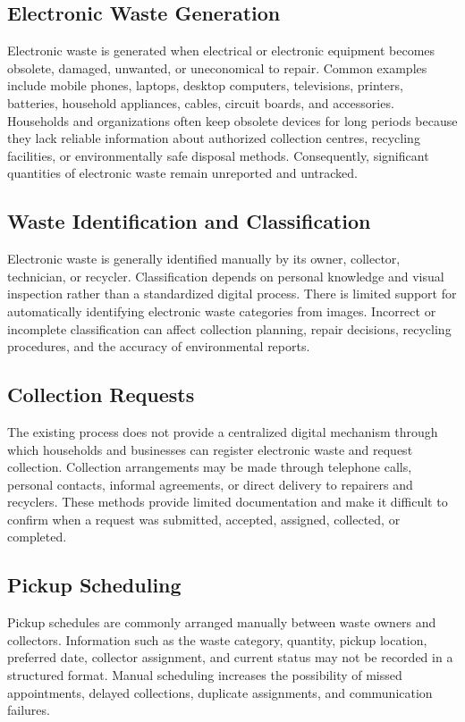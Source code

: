 \subsection{Electronic Waste Generation}
Electronic waste is generated when electrical or electronic equipment becomes
obsolete, damaged, unwanted, or uneconomical to repair. Common examples
include mobile phones, laptops, desktop computers, televisions, printers,
batteries, household appliances, cables, circuit boards, and accessories.
Households and organizations often keep obsolete devices for long periods
because they lack reliable information about authorized collection centres,
recycling facilities, or environmentally safe disposal methods. Consequently,
significant quantities of electronic waste remain unreported and untracked.

\subsection{Waste Identification and Classification}
Electronic waste is generally identified manually by its owner, collector,
technician, or recycler. Classification depends on personal knowledge and visual
inspection rather than a standardized digital process. There is limited support for
automatically identifying electronic waste categories from images. Incorrect or
incomplete classification can affect collection planning, repair decisions,
recycling procedures, and the accuracy of environmental reports.

\subsection{Collection Requests}
The existing process does not provide a centralized digital mechanism through
which households and businesses can register electronic waste and request
collection. Collection arrangements may be made through telephone calls,
personal contacts, informal agreements, or direct delivery to repairers and
recyclers. These methods provide limited documentation and make it difficult to
confirm when a request was submitted, accepted, assigned, collected, or
completed.

\subsection{Pickup Scheduling}
Pickup schedules are commonly arranged manually between waste owners and
collectors. Information such as the waste category, quantity, pickup location,
preferred date, collector assignment, and current status may not be recorded in a
structured format. Manual scheduling increases the possibility of missed
appointments, delayed collections, duplicate assignments, and communication
failures.


